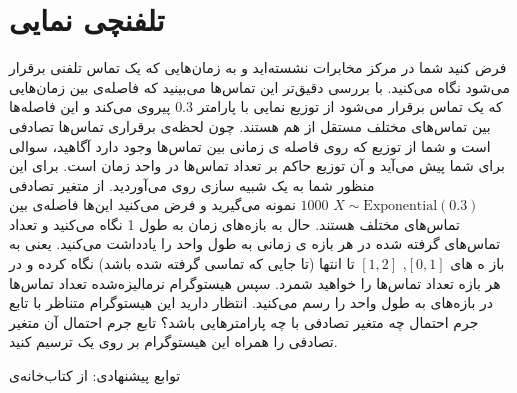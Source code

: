 \documentclass[a4paper]{article}
\begin{document}
\section{‌تلفنچی نمایی}
فرض کنید شما در مرکز مخابرات نشسته‌اید و به زمان‌هایی که یک تماس تلفنی برقرار می‌شود نگاه  می‌کنید. با بررسی دقیق‌تر این تماس‌ها می‌بینید که فاصله‌ی بین زمان‌هایی که  یک تماس برقرار می‌شود از توزیع نمایی با پارامتر $ 0.3 $ پیروی می‌کند و این فاصله‌ها بین تماس‌های مختلف مستقل از هم هستند. چون لحظه‌ی برقراری تماس‌ها تصادفی است و شما از توزیع که روی فاصله ی زمانی بین تماس‌ها وجود دارد آگاهید، سوالی برای شما پیش می‌آید و آن توزیع حاکم بر تعداد تماس‌ها در واحد زمان است. برای این منظور شما به یک شبیه سازی روی می‌آوردید. از متغیر تصادفی
$ X \sim \text{Exponential}(0.3) $
$ 1000 $ نمونه می‌گیرید و فرض می‌کنید این‌ها فاصله‌ی بین تماس‌های مختلف هستند. حال به بازه‌های زمان به طول  1 نگاه می‌کنید و تعداد تماس‌های گرفته شده در هر بازه ی زمانی به طول واحد را یادداشت می‌کنید. یعنی به باز ه های
$ [0,1] $,
$ [1,2] $
تا انتها (تا جایی که تماسی گرفته شده باشد)
نگاه کرده و در هر
بازه تعداد تماس‌ها را خواهید شمرد. سپس هیستوگرام نرمالیزه‌شده تعداد تماس‌ها در بازه‌های به طول واحد را رسم می‌کنید. انتظار دارید این هیستوگرام متناظر با تابع جرم احتمال چه متغیر تصادفی با چه پارامترهایی باشد؟ تابع جرم
احتمال آن متغیر تصادفی را همراه این هیستوگرام بر روی یک 
ترسیم کنید.

توابع پیشنهادی:
از کتاب‌خانه‌ی 
\end{document}
